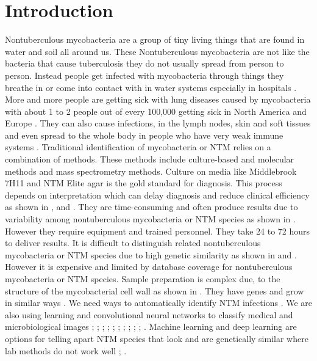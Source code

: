 \documentclass[journal,article,submit,pdftex,moreauthors]{Definitions/mdpi}
\begin{document}
\newpage
\section{Introduction}

Nontuberculous mycobacteria are a group of tiny living things that are found in water and soil all around us. These Nontuberculous mycobacteria are not like the bacteria that cause tuberculosis they do not usually spread from person to person. Instead people get infected with mycobacteria through things they breathe in or come into contact with in water systems especially in hospitals \cite{falkinham2021} \cite{griffith2007}. More and more people are getting sick with lung diseases caused by mycobacteria with about 1 to 2 people out of every 100,000 getting sick in North America and Europe \cite{prevots2015}. They can also cause infections, in the lymph nodes, skin and soft tissues and even spread to the whole body in people who have very weak immune systems \cite{falkinham2021} \cite{griffith2007}. Traditional identification of mycobacteria or NTM relies on a combination of methods. These methods include culture-based and molecular methods and mass spectrometry methods. Culture on media like Middlebrook 7H11 and NTM Elite agar is the gold standard for diagnosis. This process depends on interpretation which can delay diagnosis and reduce clinical efficiency as shown in \cite{griffith2007}, \cite{biomerieux2023} and \cite{crowley2008}. They are time-consuming and often produce results due to variability among nontuberculous mycobacteria or NTM species as shown in \cite{griffith2007}. However they require equipment and trained personnel. They take 24 to 72 hours to deliver results. It is difficult to distinguish related nontuberculous mycobacteria or NTM species due to high genetic similarity as shown in \cite{griffith2007} and \cite{turenne2018}. However it is expensive and limited by database coverage for nontuberculous mycobacteria or NTM species. Sample preparation is complex due, to the structure of the mycobacterial cell wall as shown in \cite{griffith2007}. They have genes and grow in similar ways \cite{biomerieux2023} \cite{crowley2008} \cite{turenne2018}. We need ways to automatically identify NTM infections \cite{falkinham2021} \cite{griffith2007}. We are also using learning and convolutional neural networks to classify medical and microbiological images \cite{litjens2017}; \cite{pan2022}; \cite{dietterich2000}; \cite{kumar2017}; \cite{haralick1973}; \cite{ojala2002}; \cite{esteva2017}; \cite{crowley2008}; \cite{he2016}; \cite{tan2019}; \cite{huang2017}. Machine learning and deep learning are options for telling apart NTM species that look and are genetically similar where lab methods do not work well \cite{crowley2008}; \cite{mendeley2025}.
\end{document}
